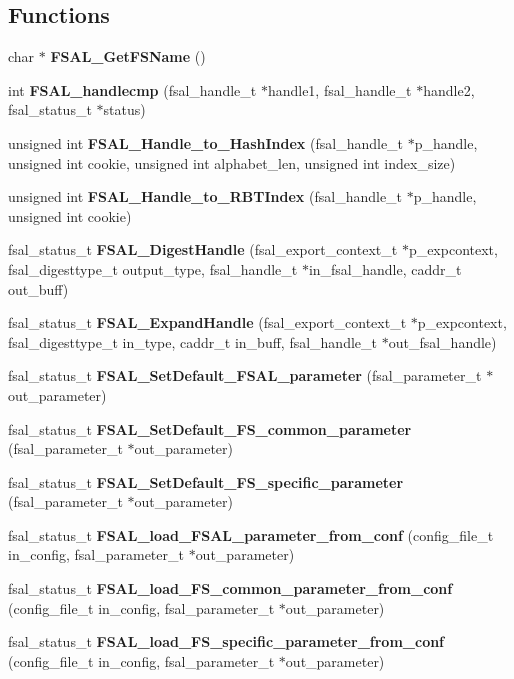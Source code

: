 \subsection*{Functions}
\begin{CompactItemize}
\item 
char $\ast$ \textbf{FSAL\_\-GetFSName} ()\label{fsal__tools_8c_5ce13ad306b54a091960744c763b3867}

\item 
int {\bf FSAL\_\-handlecmp} (fsal\_\-handle\_\-t $\ast$handle1, fsal\_\-handle\_\-t $\ast$handle2, fsal\_\-status\_\-t $\ast$status)
\item 
unsigned int {\bf FSAL\_\-Handle\_\-to\_\-HashIndex} (fsal\_\-handle\_\-t $\ast$p\_\-handle, unsigned int cookie, unsigned int alphabet\_\-len, unsigned int index\_\-size)
\item 
unsigned int \textbf{FSAL\_\-Handle\_\-to\_\-RBTIndex} (fsal\_\-handle\_\-t $\ast$p\_\-handle, unsigned int cookie)\label{fsal__tools_8c_0afe476befc56121cceeb82a69e458c5}

\item 
fsal\_\-status\_\-t {\bf FSAL\_\-DigestHandle} (fsal\_\-export\_\-context\_\-t $\ast$p\_\-expcontext, fsal\_\-digesttype\_\-t output\_\-type, fsal\_\-handle\_\-t $\ast$in\_\-fsal\_\-handle, caddr\_\-t out\_\-buff)
\item 
fsal\_\-status\_\-t {\bf FSAL\_\-ExpandHandle} (fsal\_\-export\_\-context\_\-t $\ast$p\_\-expcontext, fsal\_\-digesttype\_\-t in\_\-type, caddr\_\-t in\_\-buff, fsal\_\-handle\_\-t $\ast$out\_\-fsal\_\-handle)
\item 
fsal\_\-status\_\-t {\bf FSAL\_\-SetDefault\_\-FSAL\_\-parameter} (fsal\_\-parameter\_\-t $\ast$out\_\-parameter)
\item 
fsal\_\-status\_\-t \textbf{FSAL\_\-SetDefault\_\-FS\_\-common\_\-parameter} (fsal\_\-parameter\_\-t $\ast$out\_\-parameter)\label{fsal__tools_8c_7626d35bafe1d83233a23dac0309496a}

\item 
fsal\_\-status\_\-t \textbf{FSAL\_\-SetDefault\_\-FS\_\-specific\_\-parameter} (fsal\_\-parameter\_\-t $\ast$out\_\-parameter)\label{fsal__tools_8c_2c9026a0246b7163c494edfaaed5e8b5}

\item 
fsal\_\-status\_\-t {\bf FSAL\_\-load\_\-FSAL\_\-parameter\_\-from\_\-conf} (config\_\-file\_\-t in\_\-config, fsal\_\-parameter\_\-t $\ast$out\_\-parameter)
\item 
fsal\_\-status\_\-t \textbf{FSAL\_\-load\_\-FS\_\-common\_\-parameter\_\-from\_\-conf} (config\_\-file\_\-t in\_\-config, fsal\_\-parameter\_\-t $\ast$out\_\-parameter)\label{fsal__tools_8c_5e93d174a899b934ed30e8bedb143655}

\item 
fsal\_\-status\_\-t \textbf{FSAL\_\-load\_\-FS\_\-specific\_\-parameter\_\-from\_\-conf} (config\_\-file\_\-t in\_\-config, fsal\_\-parameter\_\-t $\ast$out\_\-parameter)\label{fsal__tools_8c_be783ef46edfd457473f20e3e5aa4073}

\end{CompactItemize}


